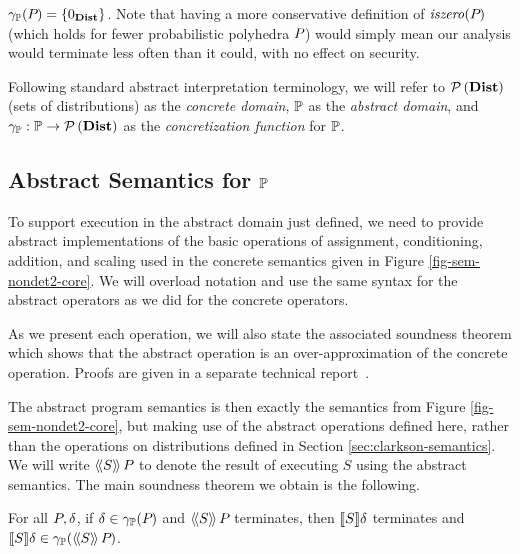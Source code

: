 $\gamma_{\mathbb{P}}(P_{}) = \left\{ 0_{\textbf{Dist}} \right\} $.  Note that having a more
conservative definition of $\mathit{iszero}(P_{})$ (which holds for fewer
probabilistic polyhedra $P_{}$) would simply mean our analysis would
terminate less often than it could, with no effect on
security.

Following standard abstract interpretation terminology, we will refer
to $\mathcal{P}\left( \textbf{Dist} \right)$ (sets of distributions) as the \textit{concrete
  domain}, $\mathbb{P}$ as the \textit{abstract domain}, and $\gamma_{\mathbb{P}}
: \mathbb{P} \rightarrow \mathcal{P}\left( \textbf{Dist} \right)$ as the \textit{concretization
  function} for $\mathbb{P}$.


\subsection{Abstract Semantics for $\mathbb{P}$}

To support execution in the abstract domain just defined, we need
to provide abstract implementations of the basic operations of assignment,
conditioning, addition, and scaling used in the concrete semantics given in
Figure \ref{fig-sem-nondet2-core}.  We will overload notation and use the
same syntax for the abstract operators as we did for the concrete operators.

As we present each operation, we will also state the associated
soundness theorem which shows that the abstract operation is an
over-approximation of the concrete operation. Proofs are given in a
separate technical report~\cite{TR}.

The abstract program semantics is then exactly the semantics from
Figure \ref{fig-sem-nondet2-core}, but making use of the abstract
operations defined here, rather than the operations on distributions
defined in Section \ref{sec:clarkson-semantics}.  We will write
$\langle\!\langle{S}\rangle\!\rangle\,{P_{}}$ to denote the result of executing $S$ using the
abstract semantics.  The main soundness theorem we obtain is the
following.
\begin{theorem}
\label{thm:pp:soundness}
For all $P_{}, \delta$, if $ \delta \in \gamma_{\mathbb{P}}(P_{}) $ and
$ \langle\!\langle{S}\rangle\!\rangle\,{P_{}} $ terminates, then $ [\![{S}]\!]{\delta} $ terminates and $
[\![{S}]\!]{\delta} \in \gamma_{\mathbb{P}}(\langle\!\langle{S}\rangle\!\rangle\,{P_{}}) $.
\end{theorem}

